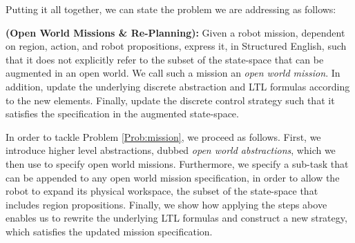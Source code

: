 Putting it all together, we can state the problem we are addressing as follows:

\begin{myProblem}\label{Prob:mission}
	\textbf{(Open World Missions \& Re-Planning):} 
	Given a robot mission, dependent on region, action, and robot propositions, express it, in Structured English, such that it does not explicitly refer to the subset of the state-space that can be augmented in an open world. We call such a mission an \emph{open world mission}. In addition, update the underlying discrete abstraction and LTL formulas according to the new elements. Finally, update the discrete control strategy such that it satisfies the specification in the augmented state-space.
\end{myProblem}

In order to tackle Problem \ref{Prob:mission}, we proceed as follows. First, we introduce higher level abstractions, dubbed \emph{open world abstractions}, %
which we then use to specify open world missions. Furthermore, we specify a sub-task that can be appended to any open world mission specification, in order to allow the robot to expand its physical workspace, the subset of the state-space that includes region propositions. Finally, we  show how applying the steps above enables us to rewrite the underlying LTL formulas and construct a new strategy, which satisfies the updated mission specification.

